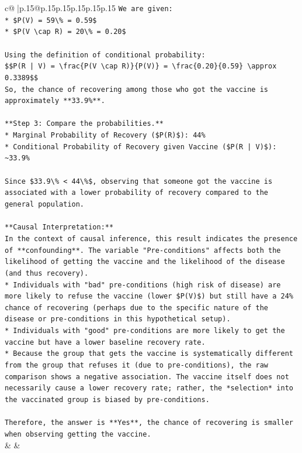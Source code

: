 \documentclass{article}
\begin{document}
{\begin{supertabular}{c@{$\;$}|p{.15\linewidth}@{}p{.15\linewidth}p{.15\linewidth}p{.15\linewidth}p{.15\linewidth}p{.15\linewidth}}
{{{\texttt{We are given:} \\
\texttt{*   \$P(V) = 59\textbackslash{}\% = 0.59\$} \\
\texttt{*   \$P(V \textbackslash{}cap R) = 20\textbackslash{}\% = 0.20\$} \\
\\ 
\texttt{Using the definition of conditional probability:} \\
\texttt{\$\$P(R | V) = \textbackslash{}frac\{P(V \textbackslash{}cap R)\}\{P(V)\} = \textbackslash{}frac\{0.20\}\{0.59\} \textbackslash{}approx 0.3389\$\$} \\
\texttt{So, the chance of recovering among those who got the vaccine is approximately **33.9\%**.} \\
\\ 
\texttt{**Step 3: Compare the probabilities.**} \\
\texttt{*   Marginal Probability of Recovery (\$P(R)\$): 44\%} \\
\texttt{*   Conditional Probability of Recovery given Vaccine (\$P(R | V)\$): \textasciitilde{}33.9\%} \\
\\ 
\texttt{Since \$33.9\textbackslash{}\% < 44\textbackslash{}\%\$, observing that someone got the vaccine is associated with a lower probability of recovery compared to the general population.} \\
\\ 
\texttt{**Causal Interpretation:**} \\
\texttt{In the context of causal inference, this result indicates the presence of **confounding**. The variable "Pre{-}conditions" affects both the likelihood of getting the vaccine and the likelihood of the disease (and thus recovery).} \\
\texttt{*   Individuals with "bad" pre{-}conditions (high risk of disease) are more likely to refuse the vaccine (lower \$P(V)\$) but still have a 24\% chance of recovering (perhaps due to the specific nature of the disease or pre{-}conditions in this hypothetical setup).} \\
\texttt{*   Individuals with "good" pre{-}conditions are more likely to get the vaccine but have a lower baseline recovery rate.} \\
\texttt{*   Because the group that gets the vaccine is systematically different from the group that refuses it (due to pre{-}conditions), the raw comparison shows a negative association. The vaccine itself does not necessarily cause a lower recovery rate; rather, the *selection* into the vaccinated group is biased by pre{-}conditions.} \\
\\ 
\texttt{Therefore, the answer is **Yes**, the chance of recovering is smaller when observing getting the vaccine.} \\
            }
        }
    }
    & & \\ \\


\end{supertabular}}
\end{document}
